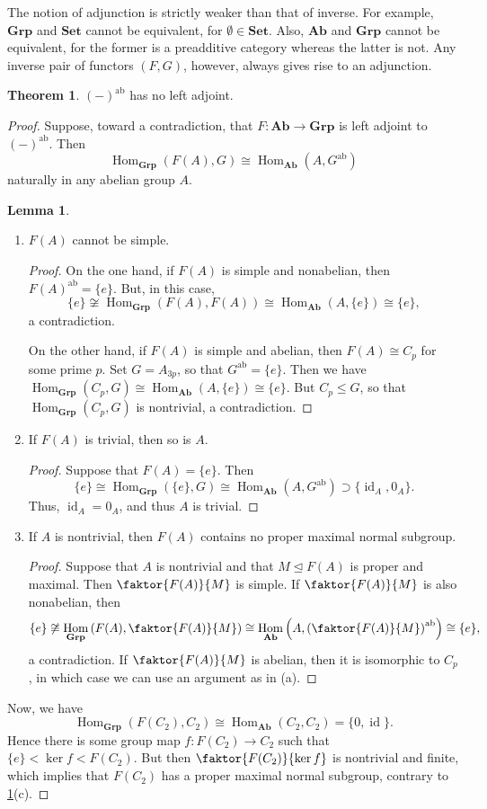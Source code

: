 \documentclass[10pt,letterpaper,cm]{nupset}
\theoremstyle{definition}
\theoremstyle{theorem}
\newtheorem{theorem}[definition]{Theorem}
\newtheorem{lemma}[definition]{Lemma}
\theoremstyle{remark}
\newcommand{\1}{\mathbf{1}}
\newcommand{\0}{\vec 0}
\DeclareMathOperator{\id}{\mathrm{id}}
\DeclareMathOperator{\ab}{ab}
\DeclareMathOperator{\Hom}{Hom}
\begin{document}
The notion of adjunction is strictly weaker than that of inverse. For example, $\mathbf{Grp}$ and $\mathbf{Set}$ cannot be equivalent, for $\emptyset \in \mathbf{Set}$. Also, $\mathbf{Ab}$ and $\mathbf{Grp}$ cannot be equivalent, for the former is a preadditive category whereas the latter is not.
Any inverse pair of functors $(F, G)$, however, always gives rise to an adjunction.


\begin{theorem}
$(-)^{\ab}$ has no left adjoint.
\end{theorem}
\begin{proof}
Suppose, toward a contradiction, that $F: \mathbf{Ab} \to \mathbf{Grp}$ is  left adjoint to $(-)^{\ab}$. Then $$\Hom_{\mathbf{Grp}}(F(A), G) \cong \Hom_{\mathbf{Ab}}(A, G^{\ab})$$ naturally in any abelian group $A$.
\begin{lemma}\label{LL} $ $
\begin{enumerate}[label=(\alph*)]
\item $F(A)$ cannot be simple.
\begin{proof}
On the one hand, if $F(A)$ is simple and nonabelian, then $F(A)^{\ab} =\{e\}$. But, in this case, $$\{e\} \not \cong \Hom_{\mathbf{Grp}}(F(A), F(A)) \cong \Hom_{\mathbf{Ab}}(A, \{e\})\cong \{e\},$$ a contradiction.

On the other hand, if $F(A)$ is simple and abelian, then $F(A) \cong C_p$ for some prime $p$. Set $G = A_{3p}$, so that $G^{\ab} = \{e\}$. Then  we have $\Hom_{\mathbf{Grp}}(C_p, G) \cong \Hom_{\mathbf{Ab}}(A, \{e\}) \cong \{e\}.$ But $C_p \leq G$, so that $\Hom_{\mathbf{Grp}}(C_p, G) $ is nontrivial, a contradiction. 
\end{proof}
\item If $F(A)$ is trivial, then so is $A$.
\begin{proof}
Suppose that $F(A)= \{e\}$. Then $$\{e\} \cong \Hom_{\mathbf{Grp}}\left(\{e\}, G\right) \cong \Hom_{\mathbf{Ab}}\left(A, G^{\ab}\right)\supset \{\id_A, 0_A\}.$$ Thus, $\id_A =0_A$, and thus $A$ is trivial.
\end{proof}
\item If $A$ is nontrivial, then $F(A)$ contains no proper maximal normal subgroup. 
\begin{proof}
Suppose that $A$ is nontrivial and that $M \unlhd F(A)$ is proper and maximal. Then $\faktor{F(A)}{M}$ is simple. If $\faktor{F(A)}{M}$ is also nonabelian, then 
$$\{e\} \not \cong \Hom_{\mathbf{Grp}}\left(F(A), \faktor{F(A)}{M}\right) \cong \Hom_{\mathbf{Ab}}\left(A, \left(\faktor{F(A)}{M}\right)^{\ab} \right)\cong \{e\},$$ a contradiction. If $\faktor{F(A)}{M}$ is abelian, then it is isomorphic to $C_p$, in which case we can use an argument as in (a).
\end{proof}
\end{enumerate}
\end{lemma}
Now, we have $$ \Hom_{\mathbf{Grp}}(F(C_2), C_2) \cong \Hom_{\mathbf{Ab}}(C_2, C_2) =\{0, \id\}.$$  Hence there is some group map $f : F(C_2) \rightarrow C_2$ such that $\{e\} < \ker{f} < F(C_2)$. But then $\faktor{F(C_2)}{\ker{f}}$ is nontrivial and finite, which implies that $F(C_2)$ has a proper maximal normal subgroup, contrary to \cref{LL}(c). 
\end{proof}
\end{document}
